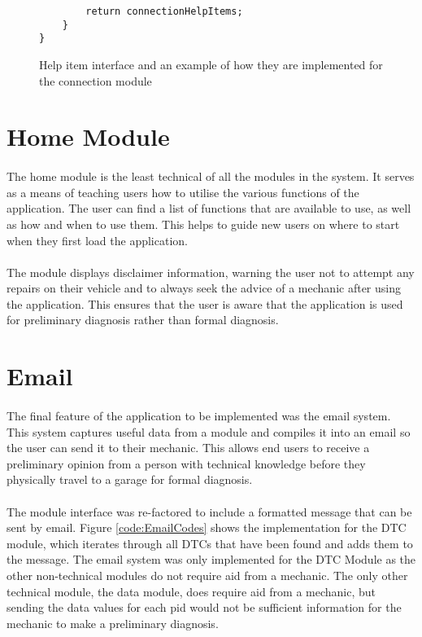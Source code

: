 {\begin{figure}[h]
\begin{lstlisting}
    	return connectionHelpItems;
	}	
}
			\end{lstlisting}
			\caption{Help item interface and an example of how they are implemented for the connection module}
			\label{code:HelpItem}
		\end{figure}
	\newpage
\section{Home Module}
		\paragraph{}{
		The home module is the least technical of all the modules in the system. It serves as a means of teaching users how to utilise the various functions of the application. The user can find a list of functions that are available to use, as well as how and when to use them. This helps to guide new users on where to start when they first load the application.
		}
				
		\paragraph{}{
		The module displays disclaimer information, warning the user not to attempt any repairs on their vehicle and to always seek the advice of a mechanic after using the application. This ensures that the user is aware that the application is used for preliminary diagnosis rather than formal diagnosis.
		}
		

\section{Email}
		\paragraph{}{
		The final feature of the application to be implemented was the email system. This system captures useful data from a module and compiles it into an email so the user can send it to their mechanic. This allows end users to receive a preliminary opinion from a person with technical knowledge before they physically travel to a garage for formal diagnosis.		
		}
		\paragraph{}{
		The module interface was re-factored to include a formatted message that can be sent by email. Figure \ref{code:EmailCodes} shows the implementation for the DTC module, which iterates through all DTCs that have been found and adds them to the message. The email system was only implemented for the DTC Module as the other non-technical modules do not require aid from a mechanic. The only other technical module, the data module, does require aid from a mechanic, but sending the data values for each pid would not be sufficient information for the mechanic to make a preliminary diagnosis.
		}

}
